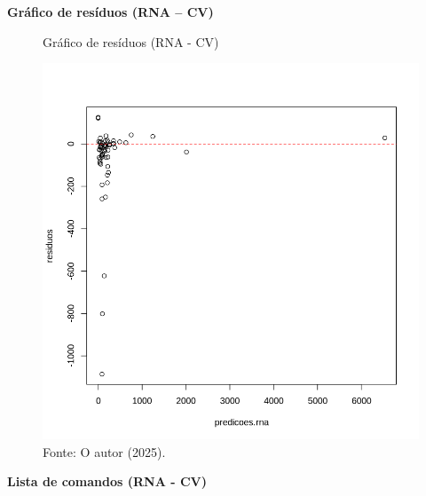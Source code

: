 \begin{center}
    \textbf{Gráfico de resíduos (RNA – CV)}
\end{center}


\begin{figure}[H]
\centering
\caption{Gráfico de resíduos (RNA - CV)}
\includegraphics[width=.8\linewidth]{apendices/fig/8_IAA008_16.png}
\caption*{Fonte: O autor (2025).}
\end{figure}



\begin{center}
    \textbf{Lista de comandos (RNA - CV)}
\end{center}



